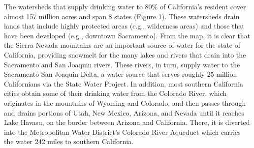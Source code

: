 \documentclass{article}
\begin{document}
The watersheds that supply drinking water to 80\% of California’s resident cover almost 157
million acres and span 8 states (Figure 1). These watersheds drain lands that include highly
protected areas (e.g., wilderness areas) and those that have been developed (e.g., downtown
Sacramento). From the map, it is clear that the Sierra Nevada mountains are an important
source of water for the state of California, providing snowmelt for the many lakes and rivers
that drain into the Sacramento and San Joaquin rivers. These rivers, in turn, supply water to the
Sacramento-San Joaquin Delta, a water source that serves roughly 25 million Californians via
the State Water Project. In addition, most southern California cities obtain some of their
drinking water from the Colorado River, which originates in the mountains of Wyoming and
Colorado, and then passes through and drains portions of Utah, New Mexico, Arizona, and
Nevada until it reaches Lake Havasu, on the border between Arizona and California. There, it is
diverted into the Metropolitan Water District’s Colorado River Aqueduct which carries the
water 242 miles to southern California. \\
\end{document}
